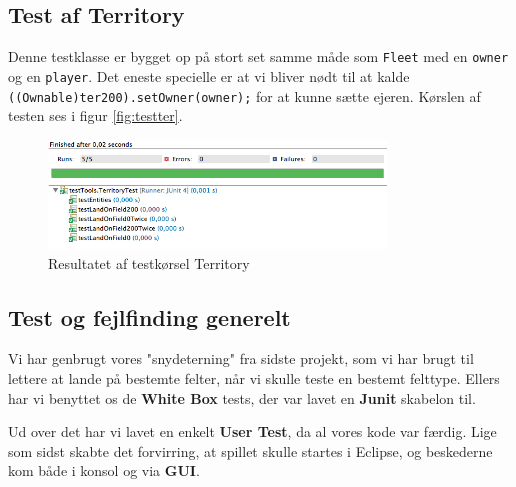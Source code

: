 \subsection{Test af Territory}
Denne testklasse er bygget op på stort set samme måde som \texttt{Fleet} med en \texttt{owner} og en \texttt{player}. Det eneste specielle er at vi bliver nødt til at kalde \texttt{((Ownable)ter200).setOwner(owner);} for at kunne sætte ejeren. Kørslen af testen ses i figur \vref{fig:testter}.
\begin{figure}[!ht]
\centering
\includegraphics[width=0.8\textwidth]{TerTest.jpg}
\caption[<Text for the list of figures>]{Resultatet af testkørsel Territory}
\label{fig:testter} 
\end{figure}
\subsection{Test og fejlfinding generelt}
Vi har genbrugt vores "snydeterning" fra sidste projekt, som vi har brugt til lettere at lande på bestemte felter, når vi skulle teste en bestemt felttype.
Ellers har vi benyttet os de \textbf{White Box} tests, der var lavet en \textbf{Junit} skabelon til.

Ud over det har vi lavet en enkelt \textbf{User Test}, da al vores kode var færdig. Lige som sidst skabte det forvirring, at spillet skulle startes i Eclipse, og beskederne kom både i konsol og via \textbf{GUI}.
\newpage